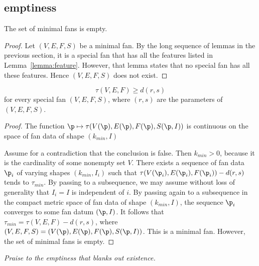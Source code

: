 \subsection{emptiness}


\begin{lemma}[]\label{lemma:min-empty}  
The set of minimal fans is empty.
\end{lemma}

\begin{proof}  Let $(V,E,F,S)$ be a minimal fan.  By the long sequence of lemmas in the
previous section, it is a special fan that has all the features listed in Lemma~\ref{lemma:feature}.
However, that lemma states that no special fan has all these features.  Hence $(V,E,F,S)$
does not exist.
\end{proof}

\begin{corollary}\label{lemma:empty-d}
\begin{displaymath}
\tau(V,E,F) \ge d (r,s)
\end{displaymath}
for every special fan $(V,E,F,S)$, where $(r,s)$ are the parameters of
$(V,E,F,S)$.
\end{corollary}

\begin{proof} 
The function $\p\mapsto \tau(V(\p),E(\p),F(\p),S(\p,I))$ is
continuous on the space of fan data of shape $(k_{min},I)$

Assume for a contradiction that the conclusion is false.  Then
$k_{min}>0$, because it is the cardinality of some nonempty set $V$.
There exists a sequence of fan data $\p_i$ of varying shapes
$(k_{min},I_i)$ such that $\tau(V(\p_i),E(\p_i),F(\p_i))-d(r,s)$
tends to $\tau_{min}$.  By passing to a subsequence, we may assume
without loss of generality that $I_i = I$ is independent of $i$.  By
passing again to a subsequence in the compact metric space of fan
data of shape $(k_{min},I)$, the sequence $\p_i$ converges to some
fan datum $(\p,I)$.  It follows that $\tau_{min} =
\tau(V,E,F)-d(r,s)$, where $(V,E,F,S)=(V(\p),E(\p),F(\p),S(\p,I))$.
This is a minimal fan.  However, the set of minimal fans is empty.
\end{proof}

 {\it Praise to
the emptiness that blanks out
existence.} %
%
